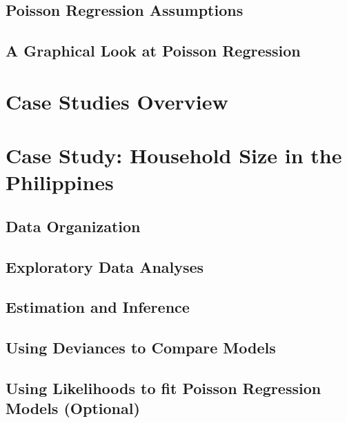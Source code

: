 \documentclass[
]{krantz}
\begin{document}
\hypertarget{poisson-regression-assumptions}{%
\subsection{Poisson Regression Assumptions}\label{poisson-regression-assumptions}}

\hypertarget{a-graphical-look-at-poisson-regression}{%
\subsection{A Graphical Look at Poisson Regression}\label{a-graphical-look-at-poisson-regression}}

\hypertarget{case-studies-overview}{%
\section{Case Studies Overview}\label{case-studies-overview}}

\hypertarget{case-study-household-size-in-the-philippines}{%
\section{Case Study: Household Size in the Philippines}\label{case-study-household-size-in-the-philippines}}

\hypertarget{organizedata1}{%
\subsection{Data Organization}\label{organizedata1}}

\hypertarget{explore}{%
\subsection{Exploratory Data Analyses}\label{explore}}

\hypertarget{sec-PoisInference}{%
\subsection{Estimation and Inference}\label{sec-PoisInference}}

\hypertarget{sec-Devtocompare}{%
\subsection{Using Deviances to Compare Models}\label{sec-Devtocompare}}

\hypertarget{likelihood.sec}{%
\subsection{Using Likelihoods to fit Poisson Regression Models (Optional)}\label{likelihood.sec}}
\end{document}
